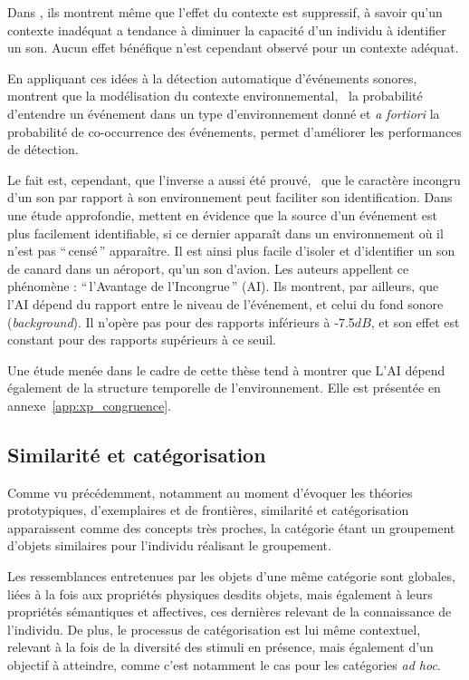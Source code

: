 Dans \citep{ballas1991effects}, ils montrent même que l'effet du contexte est suppressif, à savoir qu'un contexte inadéquat a tendance à diminuer la capacité d'un individu à identifier un son. Aucun effet bénéfique n'est cependant observé pour un contexte adéquat.

En appliquant ces idées à la détection automatique d'événements sonores, \citep{niessen2008disambiguating} montrent que la modélisation du contexte environnemental, \ie~la probabilité d'entendre un événement dans un type d'environnement donné et \emph{a fortiori} la probabilité de co-occurrence des événements, permet d'améliorer les performances de détection. 

Le fait est, cependant, que l'inverse a aussi été prouvé, \ie~que le caractère incongru d'un son par rapport à son environnement peut faciliter son identification. Dans une étude approfondie, \citep{gygi2011incongruency} mettent en évidence que la source d'un événement est plus facilement identifiable, si ce dernier apparaît dans un environnement où il n'est pas ``\,censé\,'' apparaître. Il est ainsi plus facile d'isoler et d'identifier un son de canard dans un aéroport, qu'un son d'avion. Les auteurs appellent ce phénomène : ``\,l'Avantage de l'Incongrue\,'' (AI). Ils montrent, par ailleurs, que l'AI dépend du rapport entre le niveau de l'événement, et celui du fond sonore (\emph{background}). Il n'opère pas pour des rapports inférieurs à -7.5$dB$, et son effet est constant pour des rapports supérieurs à ce seuil.

Une étude menée dans le cadre de cette thèse tend à montrer que L'AI dépend également de la structure temporelle de l'environnement. Elle est présentée en annexe~\ref{app:xp_congruence}. 

\subsection{Similarité et catégorisation}

Comme vu précédemment, notamment au moment d'évoquer les théories prototypiques, d'exemplaires et de frontières, similarité et catégorisation apparaissent comme des concepts très proches, la catégorie étant un groupement d'objets similaires pour l'individu réalisant le groupement.

Les ressemblances entretenues par les objets d'une même catégorie sont globales, liées à la fois aux propriétés physiques desdits objets, mais également à leurs propriétés sémantiques et affectives, ces dernières relevant de la connaissance de l'individu. De plus, le processus de catégorisation est lui même contextuel, relevant à la fois de la diversité des stimuli en présence, mais également d'un objectif à atteindre, comme c'est notamment le cas pour les catégories \emph{ad hoc}.

